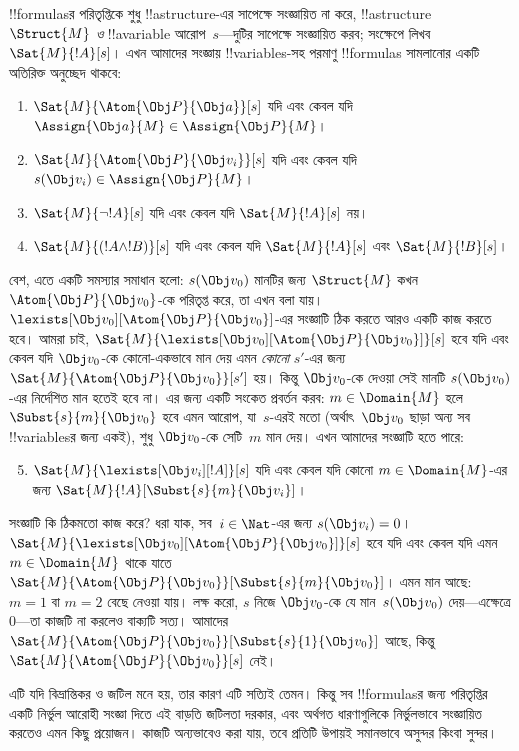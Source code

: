 \documentclass[../../../include/open-logic-section]{subfiles}
\begin{document}
!!{formula}sর পরিতৃপ্তিকে শুধু !!a{structure}-এর সাপেক্ষে সংজ্ঞায়িত না
করে, !!a{structure}~$\Struct{M}$ \emph{ও} !!a{variable} আরোপ~$s$—দুটির
সাপেক্ষে সংজ্ঞায়িত করব; সংক্ষেপে লিখব $\Sat{M}{!A}[s]$। এখন আমাদের
সংজ্ঞায় !!{variable}s-সহ পরমাণু !!{formula}s সামলানোর একটি অতিরিক্ত
অনুচ্ছেদ থাকবে:
\begin{enumerate}
  \item $\Sat{M}{\Atom{\Obj P}{\Obj a}}[s]$ যদি এবং কেবল যদি
  $\Assign{\Obj a}{M} \in \Assign{\Obj P}{M}$।
  \item $\Sat{M}{\Atom{\Obj P}{\Obj v_i}}[s]$ যদি এবং কেবল যদি
  $s(\Obj v_i) \in \Assign{\Obj P}{M}$।
  \item $\Sat{M}{\lnot !A}[s]$ যদি এবং কেবল যদি $\Sat{M}{!A}[s]$ নয়।
  \item $\Sat{M}{(!A \land !B)}[s]$ যদি এবং কেবল যদি $\Sat{M}{!A}[s]$
  এবং $\Sat{M}{!B}[s]$।
\end{enumerate}
বেশ, এতে একটি সমস্যার সমাধান হলো: $s(\Obj v_0)$ মানটির জন্য
$\Struct{M}$ কখন $\Atom{\Obj P}{\Obj v_0}$-কে পরিতৃপ্ত করে, তা এখন বলা
যায়। $\lexists[\Obj v_0][\Atom{\Obj P}{\Obj v_0}]$-এর সংজ্ঞাটি ঠিক
করতে আরও একটি কাজ করতে হবে। আমরা চাই,
$\Sat{M}{\lexists[\Obj v_0][\Atom{\Obj P}{\Obj v_0}]}[s]$ হবে যদি এবং
কেবল যদি $\Obj v_0$-কে কোনো-একভাবে মান দেয় এমন \emph{কোনো} $s'$-এর
জন্য $\Sat{M}{\Atom{\Obj P}{\Obj v_0}}[s']$ হয়। কিন্তু $\Obj v_0$-কে
দেওয়া সেই মানটি $s(\Obj v_0)$-এর নির্দেশিত মান হতেই হবে না। এর জন্য
একটি সংকেত প্রবর্তন করব: $m \in \Domain{M}$ হলে
$\Subst{s}{m}{\Obj v_0}$ হবে এমন আরোপ, যা~$s$-এরই মতো (অর্থাৎ~$\Obj v_0$
ছাড়া অন্য সব !!{variable}sর জন্য একই), শুধু $\Obj v_0$-কে সেটি~$m$
মান দেয়। এখন আমাদের সংজ্ঞাটি হতে পারে:
\begin{enumerate}\setcounter{enumi}{4}
  \item $\Sat{M}{\lexists[\Obj v_i][!A]}[s]$ যদি এবং কেবল যদি কোনো
  $m \in \Domain{M}$-এর জন্য $\Sat{M}{!A}[\Subst{s}{m}{\Obj v_i}]$।
\end{enumerate}
সংজ্ঞাটি কি ঠিকমতো কাজ করে? ধরা যাক, সব~$i \in \Nat$-এর জন্য
$s(\Obj v_i) = 0$। $\Sat{M}{\lexists[\Obj v_0][\Atom{\Obj P}{\Obj
v_0}]}[s]$ হবে যদি এবং কেবল যদি এমন $m \in \Domain{M}$ থাকে যাতে
$\Sat{M}{\Atom{\Obj P}{\Obj v_0}}[\Subst{s}{m}{\Obj v_0}]$। এমন মান
আছে: $m = 1$ বা $m = 2$ বেছে নেওয়া যায়। লক্ষ করো, $s$ নিজে
$\Obj v_0$-কে যে মান~$s(\Obj v_0)$ দেয়—এক্ষেত্রে $0$—তা কাজটি না করলেও
বাক্যটি সত্য। আমাদের $\Sat{M}{\Atom{\Obj P}{\Obj v_0}}[\Subst{s}{1}{\Obj
v_0}]$ আছে, কিন্তু $\Sat{M}{\Atom{\Obj P}{\Obj v_0}}[s]$ নেই।

এটি যদি বিভ্রান্তিকর ও জটিল মনে হয়, তার কারণ এটি সত্যিই তেমন। কিন্তু সব
!!{formula}sর জন্য পরিতৃপ্তির একটি নির্ভুল আরোহী সংজ্ঞা দিতে এই বাড়তি
জটিলতা দরকার, এবং অর্থগত ধারণাগুলিকে নির্ভুলভাবে সংজ্ঞায়িত করতেও এমন
কিছু প্রয়োজন। কাজটি অন্যভাবেও করা যায়, তবে প্রতিটি উপায়ই সমানভাবে
অসুন্দর কিংবা সুন্দর।
\end{document}

